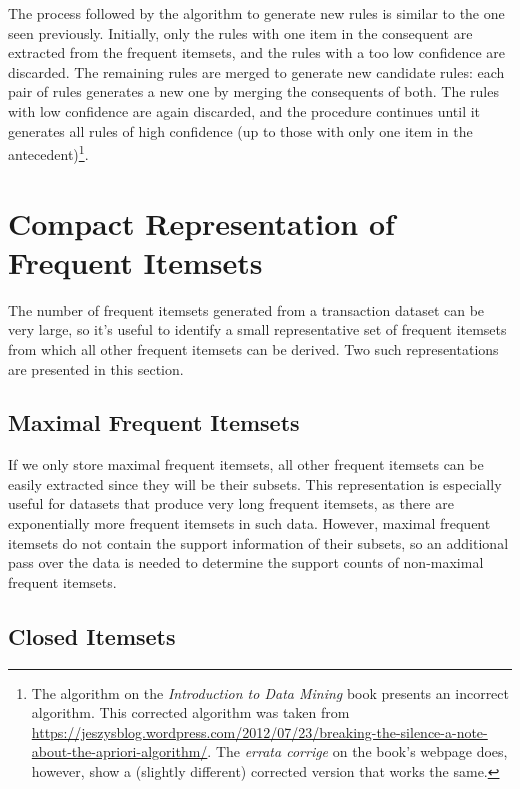 The process followed by the algorithm to generate new rules is similar to the one seen previously. Initially, only the rules with one item in the consequent are extracted from the frequent itemsets, and the rules with a too low confidence are discarded. The remaining rules are merged to generate new candidate rules: each pair of rules generates a new one by merging the consequents of both. The rules with low confidence are again discarded, and the procedure continues until it generates all rules of high confidence (up to those with only one item in the antecedent)\footnote{The algorithm on the \textit{Introduction to Data Mining} book presents an incorrect algorithm. This corrected algorithm was taken from \url{https://jeszysblog.wordpress.com/2012/07/23/breaking-the-silence-a-note-about-the-apriori-algorithm/}. The \textit{errata corrige} on the book's webpage does, however, show a (slightly different) corrected version that works the same.}. 

\section{Compact Representation of Frequent Itemsets}

The number of frequent itemsets generated from a transaction dataset can be very large, so it's useful to identify a small representative set of frequent itemsets from which all other frequent itemsets can be derived. Two such representations are presented in this section.

\subsection{Maximal Frequent Itemsets}


If we only store maximal frequent itemsets, all other frequent itemsets can be easily extracted since they will be their subsets. This representation is especially useful for datasets that produce very long frequent itemsets, as there are exponentially more frequent itemsets in such data. However, maximal frequent itemsets do not contain the support information of their subsets, so an additional pass over the data is needed to determine the support counts of non-maximal frequent itemsets.

\subsection{Closed Itemsets}

